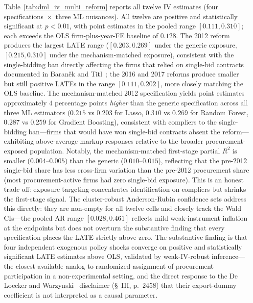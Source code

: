 \documentclass[11pt]{article}
\begin{document}


Table~\ref{tab:dml_iv_multi_reform} reports all twelve IV estimates (four specifications~$\times$~three ML nuisances). All twelve are positive and statistically significant at $p < 0.01$, with point estimates in the pooled range $[0.111, 0.310]$; each exceeds the OLS firm-plus-year-FE baseline of $0.128$. The 2012 reform produces the largest LATE range ($[0.203, 0.269]$ under the generic exposure, $[0.215, 0.310]$ under the mechanism-matched exposure), consistent with the single-bidding ban directly affecting the firms that relied on single-bid contracts documented in Baran\v{e}k and Titl~\cite{BaranekTitl2024}; the 2016 and 2017 reforms produce smaller but still positive LATEs in the range $[0.111, 0.202]$, more closely matching the OLS baseline. The mechanism-matched 2012 specification yields point estimates approximately $4$ percentage points \emph{higher} than the generic specification across all three ML estimators ($0.215$ vs $0.203$ for Lasso, $0.310$ vs $0.269$ for Random Forest, $0.287$ vs $0.259$ for Gradient Boosting), consistent with compliers to the single-bidding ban---firms that would have won single-bid contracts absent the reform---exhibiting above-average markup responses relative to the broader procurement-exposed population. Notably, the mechanism-matched first-stage partial $R^2$ is smaller ($0.004$--$0.005$) than the generic ($0.010$--$0.015$), reflecting that the pre-2012 single-bid share has less cross-firm variation than the pre-2012 procurement share (most procurement-active firms had zero single-bid exposure). This is an honest trade-off: exposure targeting concentrates identification on compliers but shrinks the first-stage signal. The cluster-robust Anderson-Rubin confidence sets address this directly: they are non-empty for all twelve cells and closely track the Wald CIs---the pooled AR range $[0.028, 0.461]$ reflects mild weak-instrument inflation at the endpoints but does not overturn the substantive finding that every specification places the LATE strictly above zero. The substantive finding is that four independent exogenous policy shocks converge on positive and statistically significant LATE estimates above OLS, validated by weak-IV-robust inference---the closest available analog to randomized assignment of procurement participation in a non-experimental setting, and the direct response to the De Loecker and Warzynski~\cite{DLW2012} disclaimer (\S~III, p.~2458) that their export-dummy coefficient is not interpreted as a causal parameter.
\end{document}
